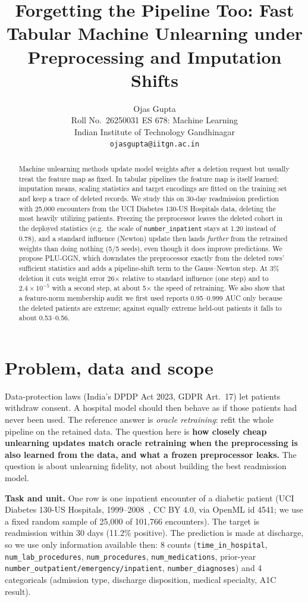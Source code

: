 \documentclass{article}
\title{Forgetting the Pipeline Too: Fast Tabular Machine Unlearning under Preprocessing and Imputation Shifts}
\author{%
  Ojas Gupta \\
  Roll No.\ 26250031 \quad ES 678: Machine Learning\\
  Indian Institute of Technology Gandhinagar\\
  \texttt{ojasgupta@iitgn.ac.in} \\
}
\begin{document}
\maketitle

\begin{abstract}
Machine unlearning methods update model weights after a deletion request but usually treat the
feature map as fixed. In tabular pipelines the feature map is itself learned: imputation means,
scaling statistics and target encodings are fitted on the training set and keep a trace of
deleted records. We study this on 30-day readmission prediction with 25{,}000 encounters from the
UCI Diabetes 130-US Hospitals data, deleting the most heavily utilizing patients. Freezing the
preprocessor leaves the deleted cohort in the deployed statistics (e.g.\ the scale of
\texttt{number\_inpatient} stays at 1.20 instead of 0.78), and a standard influence (Newton) update
then lands \emph{further} from the retrained weights than doing nothing (5/5 seeds), even though it
does improve predictions. We propose PLU-GGN, which downdates the preprocessor exactly from the
deleted rows' sufficient statistics and adds a pipeline-shift term to the Gauss--Newton step. At 3\%
deletion it cuts weight error 26$\times$ relative to standard influence (one step) and to
$2.4\times10^{-5}$ with a second step, at about 5$\times$ the speed of retraining. We also show
that a feature-norm membership audit we first used reports 0.95--0.999 AUC only because the
deleted patients are extreme; against equally extreme held-out patients it falls to about 0.53--0.56.
\end{abstract}

\section{Problem, data and scope}
\label{sec:problem}
Data-protection laws (India's DPDP Act 2023, GDPR Art.~17) let patients withdraw consent. A
hospital model should then behave as if those patients had never been used. The reference answer
is \emph{oracle retraining}: refit the whole pipeline on the retained data. The question here is
\textbf{how closely cheap unlearning updates match oracle retraining when the preprocessing is
also learned from the data, and what a frozen preprocessor leaks.} The question is about unlearning
fidelity, not about building the best readmission model.

\textbf{Task and unit.} One row is one inpatient encounter of a diabetic patient (UCI Diabetes
130-US Hospitals, 1999--2008~\cite{strack2014}, CC BY 4.0, via OpenML id 4541; we use a fixed random
sample of 25{,}000 of 101{,}766 encounters). The target is readmission within 30 days (11.2\%
positive). The prediction is made at discharge, so we use only information available then: 8 counts
(\texttt{time\_in\_hospital}, \texttt{num\_lab\_procedures}, \texttt{num\_procedures},
\texttt{num\_medications}, prior-year \texttt{number\_outpatient/emergency/inpatient},
\texttt{number\_diagnoses}) and 4 categoricals (admission type, discharge disposition, medical
specialty, A1C result).
\end{document}
